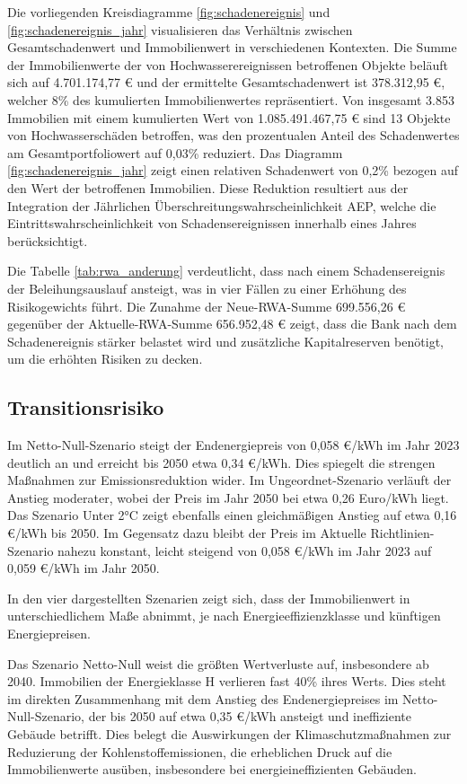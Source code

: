Die vorliegenden Kreisdiagramme \ref{fig:schadenereignis} und \ref{fig:schadenereignis_jahr} visualisieren das Verhältnis zwischen Gesamtschadenwert und Immobilienwert in verschiedenen Kontexten. Die Summe der Immobilienwerte der von Hochwasserereignissen betroffenen Objekte beläuft sich auf 4.701.174,77 € und der ermittelte Gesamtschadenwert ist 378.312,95 €, welcher 8\% des kumulierten Immobilienwertes repräsentiert. Von insgesamt 3.853 Immobilien mit einem kumulierten Wert von 1.085.491.467,75 € sind 13 Objekte von Hochwasserschäden betroffen, was den prozentualen Anteil des Schadenwertes am Gesamtportfoliowert auf  0,03\% reduziert. Das Diagramm \ref{fig:schadenereignis_jahr} zeigt einen relativen Schadenwert von 0,2\% bezogen auf den Wert der betroffenen Immobilien. Diese Reduktion resultiert aus der Integration der Jährlichen Überschreitungswahrscheinlichkeit \ac{AEP}, welche die Eintrittswahrscheinlichkeit von Schadensereignissen innerhalb eines Jahres berücksichtigt.

Die Tabelle \ref{tab:rwa_anderung} verdeutlicht, dass nach einem Schadensereignis der Beleihungsauslauf ansteigt, was in vier Fällen zu einer Erhöhung des Risikogewichts  führt. Die Zunahme der Neue-\ac{RWA}-Summe 699.556,26 € gegenüber der Aktuelle-\ac{RWA}-Summe 656.952,48 € zeigt, dass die Bank nach dem Schadenereignis stärker belastet wird und zusätzliche Kapitalreserven benötigt, um die erhöhten Risiken zu decken.


\subsection{Transitionsrisiko}

Im Netto-Null-Szenario steigt der Endenergiepreis von 0,058 €/kWh im Jahr 2023 deutlich an und erreicht bis 2050 etwa 0,34 €/kWh. Dies spiegelt die strengen Maßnahmen zur Emissionsreduktion wider. Im Ungeordnet-Szenario verläuft der Anstieg moderater, wobei der Preis im Jahr 2050 bei etwa 0,26 Euro/kWh liegt. Das Szenario Unter 2°C zeigt ebenfalls einen gleichmäßigen Anstieg auf etwa 0,16 €/kWh bis 2050. Im Gegensatz dazu bleibt der Preis im Aktuelle Richtlinien-Szenario nahezu konstant, leicht steigend von 0,058 €/kWh im Jahr 2023 auf 0,059 €/kWh im Jahr 2050.

In den vier dargestellten Szenarien zeigt sich, dass der Immobilienwert in unterschiedlichem Maße abnimmt, je nach Energieeffizienzklasse und künftigen Energiepreisen. 

Das Szenario Netto-Null weist die größten Wertverluste auf, insbesondere ab 2040. Immobilien der Energieklasse H verlieren fast 40\% ihres Werts. Dies steht im direkten Zusammenhang mit dem Anstieg des Endenergiepreises im Netto-Null-Szenario, der bis 2050 auf etwa 0,35 €/kWh ansteigt und ineffiziente Gebäude betrifft. Dies belegt die Auswirkungen der Klimaschutzmaßnahmen zur Reduzierung der Kohlenstoffemissionen, die erheblichen Druck auf die Immobilienwerte ausüben, insbesondere bei energieineffizienten Gebäuden.

